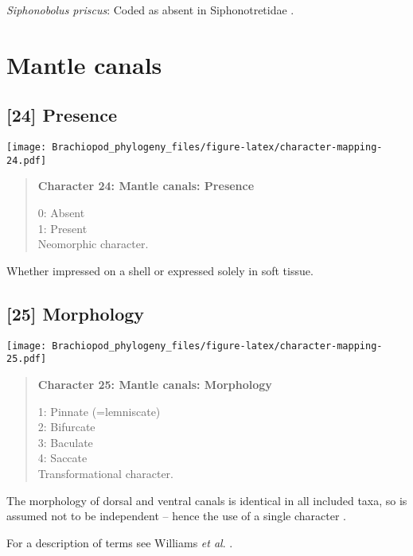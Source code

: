 \documentclass[openany]{book}
\theoremstyle{definition}
\theoremstyle{definition}
\theoremstyle{definition}
\theoremstyle{remark}
\begin{document}
\hypertarget{Siphonobolus_priscus-coding-23}{}
\emph{Siphonobolus priscus}: Coded as absent in Siphonotretidae
\citep[table 6]{Williams2000LinguliformeaCraniiformea}.

\section{Mantle canals}\label{mantle-canals}

\subsection*{{[}24{]} Presence}\label{presence}

\texttt{[image: Brachiopod\_phylogeny\_files/figure-latex/character-mapping-24.pdf]}

\begin{quote}
\textbf{Character 24: Mantle canals: Presence}

0: Absent\\
1: Present\\
Neomorphic character.
\end{quote}

Whether impressed on a shell or expressed solely in soft tissue.

\subsection*{{[}25{]} Morphology}\label{morphology-1}

\texttt{[image: Brachiopod\_phylogeny\_files/figure-latex/character-mapping-25.pdf]}

\begin{quote}
\textbf{Character 25: Mantle canals: Morphology}

1: Pinnate (=lemniscate)\\
2: Bifurcate\\
3: Baculate\\
4: Saccate\\
Transformational character.
\end{quote}

The morphology of dorsal and ventral canals is identical in all included
taxa, so is assumed not to be independent -- hence the use of a single
character \citep[contra][]{Williams2000LinguliformeaCraniiformea}.

For a description of terms see Williams \emph{et al}.
\citeyearpar[2000]{Williams1997Introduction}.
\end{document}
